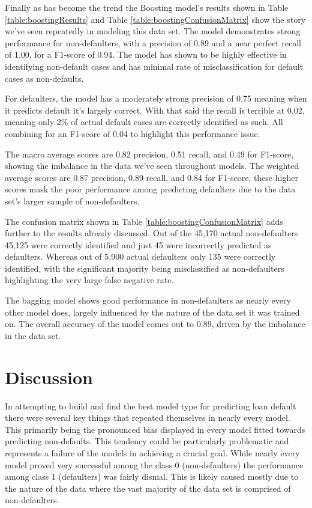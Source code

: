 \documentclass[12pt]{article}
\begin{document}
Finally as has become the trend the Boosting model's results shown in Table \ref{table:boostingResults} and Table \ref{table:boostingConfusionMatrix} show the story we've seen repeatedly in modeling this data set. The model demonstrates strong performance for non-defaulters, with a precision of 0.89 and a near perfect recall of 1.00, for a F1-score of 0.94. The model has shown to be highly effective in identifying non-default cases and has minimal rate of misclassification for default cases as non-defaults.

For defaulters, the model has a moderately strong precision of 0.75 meaning when it predicts default it's largely correct. With that said the recall is terrible at 0.02, meaning only 2\% of actual default cases are correctly identified as such. All combining for an F1-score of 0.04 to highlight this performance issue.

The macro average scores are 0.82 precision, 0.51 recall, and 0.49 for F1-score, showing the imbalance in the data we've seen throughout models. The weighted average scores are 0.87 precision, 0.89 recall, and 0.84 for F1-score, these higher scores mask the poor performance among predicting defaulters due to the data set's larger sample of non-defaulters.

The confusion matrix shown in Table \ref{table:boostingConfusionMatrix} adds further to the results already discussed. Out of the 45,170 actual non-defaulters 45,125 were correctly identified and just 45 were incorrectly predicted as defaulters. Whereas out of 5,900 actual defaulters only 135 were correctly identified, with the significant majority being misclassified as non-defaulters highlighting the very large false negative rate.

The bagging model shows good performance in non-defaulters as nearly every other model does, largely influenced by the nature of the data set it was trained on. The overall accuracy of the model comes out to 0.89, driven by the imbalance in the data set.

\section{Discussion}
\label{sec:disc}

In attempting to build and find the best model type for predicting loan default there were several key things that repeated themselves in nearly every model. This primarily being the pronounced bias displayed in every model fitted towards predicting non-defaults. This tendency could be particularly problematic and represents a failure of the models in achieving a crucial goal. While nearly every model proved very successful among the class 0 (non-defaulters) the performance among class 1 (defaulters) was fairly dismal. This is likely caused mostly due to the nature of the data where the vast majority of the data set is comprised of non-defaulters. 
\end{document}
